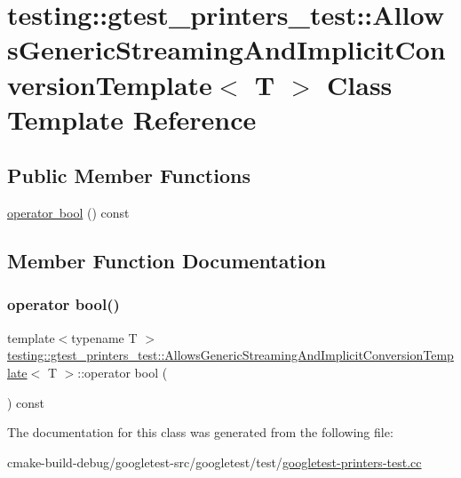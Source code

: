 \hypertarget{classtesting_1_1gtest__printers__test_1_1AllowsGenericStreamingAndImplicitConversionTemplate}{}\section{testing\+::gtest\+\_\+printers\+\_\+test\+::Allows\+Generic\+Streaming\+And\+Implicit\+Conversion\+Template$<$ T $>$ Class Template Reference}
\label{classtesting_1_1gtest__printers__test_1_1AllowsGenericStreamingAndImplicitConversionTemplate}
\subsection*{Public Member Functions}
\begin{DoxyCompactItemize}
\item 
\mbox{\hyperlink{classtesting_1_1gtest__printers__test_1_1AllowsGenericStreamingAndImplicitConversionTemplate_af5f8ea44d7d86283b4c004a994ddd7f9}{operator bool}} () const
\end{DoxyCompactItemize}


\subsection{Member Function Documentation}
\mbox{\label{classtesting_1_1gtest__printers__test_1_1AllowsGenericStreamingAndImplicitConversionTemplate_af5f8ea44d7d86283b4c004a994ddd7f9}} 
\subsubsection{\texorpdfstring{operator bool()}{operator bool()}}
{\footnotesize\ttfamily template$<$typename T $>$ \\
\mbox{\hyperlink{classtesting_1_1gtest__printers__test_1_1AllowsGenericStreamingAndImplicitConversionTemplate}{testing\+::gtest\+\_\+printers\+\_\+test\+::\+Allows\+Generic\+Streaming\+And\+Implicit\+Conversion\+Template}}$<$ T $>$\+::operator bool (\begin{DoxyParamCaption}{ }\end{DoxyParamCaption}) const\hspace{0.3cm}{\ttfamily [inline]}}



The documentation for this class was generated from the following file\+:\begin{DoxyCompactItemize}
\item 
cmake-\/build-\/debug/googletest-\/src/googletest/test/\mbox{\hyperlink{googletest-printers-test_8cc}{googletest-\/printers-\/test.\+cc}}\end{DoxyCompactItemize}
